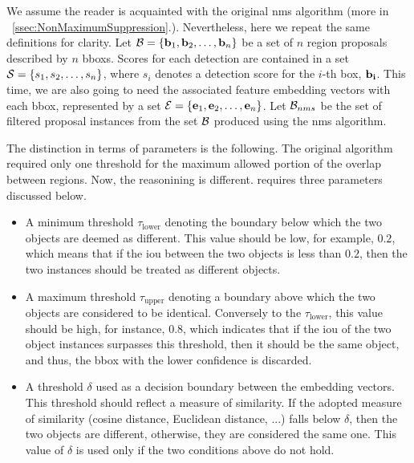 We assume the reader is acquainted with the original \gls{nms} algorithm (more in \sectiontext{}~\ref{ssec:NonMaximumSuppression}.). Nevertheless, here we repeat the same definitions for clarity. Let $\mathcal{B} = \left\{ {\mathbf{b}_1, \mathbf{b}_2, \dots, \mathbf{b}_n} \right\}$ be a set of $n$ region proposals described by $n$ \glspl{bbox}. Scores for each detection are contained in a set $\mathcal{S} = \left\{ {s_1, s_2, \dots, s_n} \right\}$, where $s_i$ denotes a detection score for the $i$-th box, $\mathbf{b_i}$. This time, we are also going to need the associated feature embedding vectors with each \gls{bbox}, represented by a set $\mathcal{E} = \left\{ {\mathbf{e}_1, \mathbf{e}_2, \dots, \mathbf{e}_n} \right\}$. Let $\mathcal{B}_{nms}$ be  the set of filtered proposal instances from the set $\mathcal{B}$ produced using the \gls{nms} algorithm.

\def\threshlower{\tau_{\text{lower}}}
\def\threshupper{\tau_{\text{upper}}}
\def\threshsim{\delta}

The distinction in terms of parameters is the following. The original algorithm required only one threshold for the maximum allowed portion of the overlap between regions. Now, the reasonining is different. \featurenms{} requires three parameters discussed below.
\begin{itemize}
    \item A minimum threshold $\threshlower$ denoting the boundary below which the two objects are deemed as different. This value should be low, for example, $0.2$, which means that if the \gls{iou} between the two objects is less than $0.2$, then the two instances should be treated as different objects.
    \item A maximum threshold $\threshupper$ denoting a boundary above which the two objects are considered to be identical. Conversely to the $\threshlower$, this value should be high, for instance, $0.8$, which indicates that if the \gls{iou} of the two object instances surpasses this threshold, then it should be the same object, and thus, the \gls{bbox} with the lower confidence is discarded.
    \item A threshold $\threshsim$ used as a decision boundary between the embedding vectors. This threshold should reflect a measure of similarity. If the adopted measure of similarity (cosine distance, Euclidean distance, ...) falls below $\threshsim$, then the two objects are different, otherwise, they are considered the same one. This value of $\threshsim$ is used only if the two conditions above do not hold.
\end{itemize}

